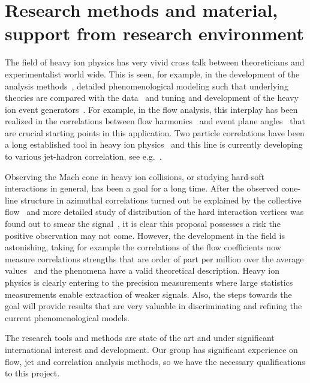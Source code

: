 \section{Research methods and material, support from research environment} %
\label{sec:researchmethods}

The field of heavy ion physics has very vivid cross talk between theoreticians and experimentalist world wide. This is seen, for example, in the development of the analysis methods~\cite{Poskanzer:1998yz,Bilandzic:2010jr}, detailed phenomenological modeling such that underlying theories are compared with the data~\cite{Burke:2013yra,Renk:2011gj,Niemi:2015qia} and tuning and development of the heavy ion event generators~\cite{Gyulassy:1994ew,Lin:2004en,Lokhtin2006}. For example, in the flow analysis, this interplay has been realized in the correlations between flow harmonics~\cite{Poskanzer:1998yz,ALICE:2011ab} and event plane angles~\cite{Aad:2014fla,Bhalerao:2014xra} that are crucial starting points in this application. Two particle correlations have been a long established tool in heavy ion physics~\cite{PhysRevLett.95.152301,PhysRevLett.97.052301} and this line is currently developing to various jet-hadron correlation, see e.g.~\cite{Khachatryan:2016tfj}. 

Observing the Mach cone in heavy ion collisions, or studying hard-soft interactions in general, has been a goal for a long time. After the observed cone-line structure in azimuthal correlations turned out be explained by the collective flow~\cite{ALICE:2011ab} and more detailed study of distribution of the hard interaction vertices was found out to smear the signal~\cite{Tachibana:2015qxa}, it is clear this proposal possesses a risk the positive observation may not come. However, the development in the field is astonishing, taking for example the correlations of the flow coefficients now measure correlations strengths that are order of part per million over the average values~\cite{ALICE:2016kpq} and the phenomena have a valid theoretical description. Heavy ion physics is clearly entering to the precision measurements where large statistics measurements enable extraction of weaker signals. Also, the steps towards the goal will provide results that are very valuable in discriminating and refining the current phenomenological models.

The research tools and methods are state of the art and under significant international interest and development. Our group has significant experience on flow, jet and correlation analysis methods, so we have the necessary qualifications to this project.

